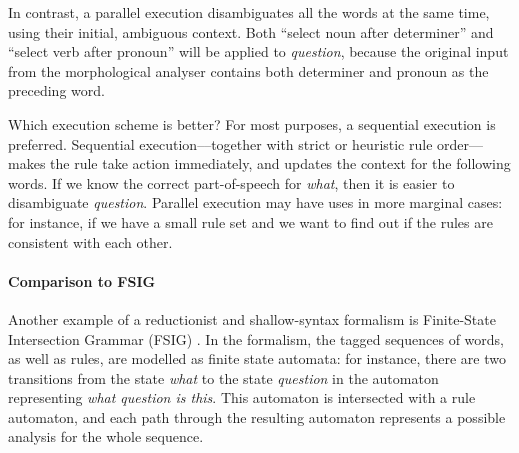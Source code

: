 In contrast, a parallel execution disambiguates all the words at the same time, using their initial, ambiguous context. Both ``select noun after determiner'' and ``select verb after pronoun'' will be applied to \emph{question}, because the original input from the morphological analyser contains both determiner and pronoun as the preceding word.

Which execution scheme is better? For most purposes, a sequential execution is preferred.  Sequential execution–--together with strict or heuristic rule order---makes the rule take action immediately, and updates the context for the following words. If we know the correct part-of-speech for \emph{what}, then it is easier to disambiguate \emph{question}.
Parallel execution may have uses in more marginal cases: for instance, if we have a small rule set and we want to find out if the rules are consistent with each other. 



% 
% 
% 
% 
% 
\paragraph{Comparison to FSIG} 
Another example of a reductionist and shallow-syntax formalism is
Finite-State Intersection Grammar (FSIG) \citep{koskenniemi90}. In the
formalism, the tagged sequences of words, as well as rules, are modelled
as finite state automata: for instance, there are two transitions from
the state \emph{what} to the state \emph{question} in the automaton
representing \emph{what question is this}. This automaton is intersected with
a rule automaton, and each path through the resulting automaton
represents a possible analysis for the whole sequence.
 
